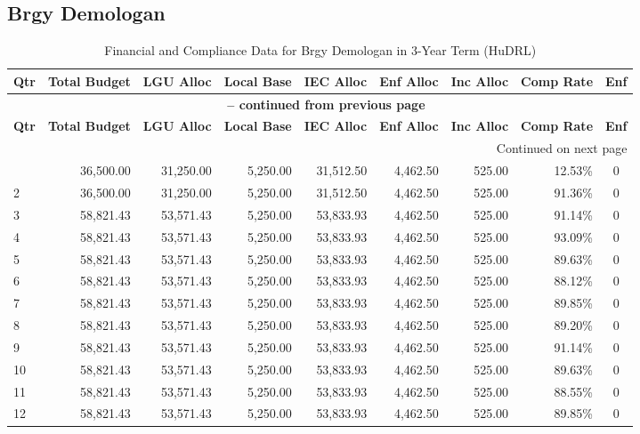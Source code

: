 \subsection{Brgy Demologan}
\begin{longtable}{lrrrrrrrc}
\caption{Financial and Compliance Data for Brgy Demologan in 3-Year Term (HuDRL)} \\
\toprule
\textbf{Qtr} & \textbf{Total Budget} & \textbf{LGU Alloc} & \textbf{Local Base} & \textbf{IEC Alloc} & \textbf{Enf Alloc} & \textbf{Inc Alloc} & \textbf{Comp Rate} & \textbf{Enf} \\
\midrule
\endfirsthead
\multicolumn{9}{c}{{\bfseries \tablename\ \thetable{} -- continued from previous page}} \\
\toprule
\textbf{Qtr} & \textbf{Total Budget} & \textbf{LGU Alloc} & \textbf{Local Base} & \textbf{IEC Alloc} & \textbf{Enf Alloc} & \textbf{Inc Alloc} & \textbf{Comp Rate} & \textbf{Enf} \\
\midrule
\endhead
\hline \multicolumn{9}{r}{{Continued on next page}} \\ \hline
\endfoot
\bottomrule
\endlastfoot
1 & 36,500.00 & 31,250.00 & 5,250.00 & 31,512.50 & 4,462.50 & 525.00 & 12.53\% & 0 \\
2 & 36,500.00 & 31,250.00 & 5,250.00 & 31,512.50 & 4,462.50 & 525.00 & 91.36\% & 0 \\
3 & 58,821.43 & 53,571.43 & 5,250.00 & 53,833.93 & 4,462.50 & 525.00 & 91.14\% & 0 \\
4 & 58,821.43 & 53,571.43 & 5,250.00 & 53,833.93 & 4,462.50 & 525.00 & 93.09\% & 0 \\
5 & 58,821.43 & 53,571.43 & 5,250.00 & 53,833.93 & 4,462.50 & 525.00 & 89.63\% & 0 \\
6 & 58,821.43 & 53,571.43 & 5,250.00 & 53,833.93 & 4,462.50 & 525.00 & 88.12\% & 0 \\
7 & 58,821.43 & 53,571.43 & 5,250.00 & 53,833.93 & 4,462.50 & 525.00 & 89.85\% & 0 \\
8 & 58,821.43 & 53,571.43 & 5,250.00 & 53,833.93 & 4,462.50 & 525.00 & 89.20\% & 0 \\
9 & 58,821.43 & 53,571.43 & 5,250.00 & 53,833.93 & 4,462.50 & 525.00 & 91.14\% & 0 \\
10 & 58,821.43 & 53,571.43 & 5,250.00 & 53,833.93 & 4,462.50 & 525.00 & 89.63\% & 0 \\
11 & 58,821.43 & 53,571.43 & 5,250.00 & 53,833.93 & 4,462.50 & 525.00 & 88.55\% & 0 \\
12 & 58,821.43 & 53,571.43 & 5,250.00 & 53,833.93 & 4,462.50 & 525.00 & 89.85\% & 0 \\
\end{longtable}
\newpage
